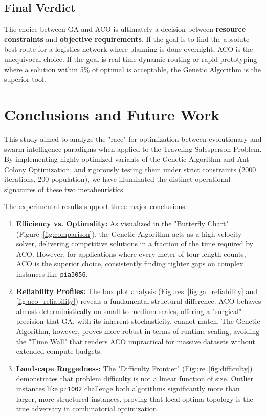\documentclass[11pt,a4paper]{article}
\begin{document}
\subsection{Final Verdict}
The choice between GA and ACO is ultimately a decision between \textbf{resource constraints} and \textbf{objective requirements}. If the goal is to find the absolute best route for a logistics network where planning is done overnight, ACO is the unequivocal choice. If the goal is real-time dynamic routing or rapid prototyping where a solution within 5\% of optimal is acceptable, the Genetic Algorithm is the superior tool.

\section{Conclusions and Future Work}
This study aimed to analyze the "race" for optimization between evolutionary and swarm intelligence paradigms when applied to the Traveling Salesperson Problem. By implementing highly optimized variants of the Genetic Algorithm and Ant Colony Optimization, and rigorously testing them under strict constraints (2000 iterations, 200 population), we have illuminated the distinct operational signatures of these two metaheuristics.

The experimental results support three major conclusions:
\begin{enumerate}
    \item \textbf{Efficiency vs. Optimality:} As visualized in the "Butterfly Chart" (Figure~\ref{fig:comparison}), the Genetic Algorithm acts as a high-velocity solver, delivering competitive solutions in a fraction of the time required by ACO. However, for applications where every meter of tour length counts, ACO is the superior choice, consistently finding tighter gaps on complex instances like \texttt{pia3056}.
    \item \textbf{Reliability Profiles:} The box plot analysis (Figures~\ref{fig:ga_reliability} and \ref{fig:aco_reliability}) reveals a fundamental structural difference. ACO behaves almost deterministically on small-to-medium scales, offering a "surgical" precision that GA, with its inherent stochasticity, cannot match. The Genetic Algorithm, however, proves more robust in terms of runtime scaling, avoiding the "Time Wall" that renders ACO impractical for massive datasets without extended compute budgets.
    \item \textbf{Landscape Ruggedness:} The "Difficulty Frontier" (Figure~\ref{fig:difficulty}) demonstrates that problem difficulty is not a linear function of size. Outlier instances like \texttt{pr1002} challenge both algorithms significantly more than larger, more structured instances, proving that local optima topology is the true adversary in combinatorial optimization.
\end{enumerate}
\end{document}
